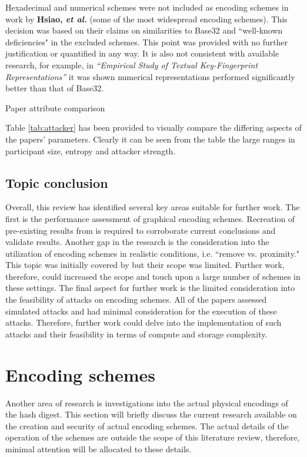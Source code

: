 Hexadecimal and numerical schemes were not included as encoding schemes in work by \textbf{Hsiao, \textit{et al.}}\cite{hsiao2009study} (some of the most widespread encoding schemes). This decision was based on their claims on similarities to Base32 and ``well-known deficiencies" in the excluded schemes. This point was provided with no further justification or quantified in any way. It is also not consistent with available research, for example, in \textit{``Empirical Study of Textual Key-Fingerprint Representations''}\cite{dechand2016empirical} it was shown numerical representations performed significantly better than that of Base32.

\begin{table}[h!]
    \makebox[\textwidth][c]{
        
    }%
    \caption{Paper attribute comparison}
    \label{tab:attacker}
\end{table}

Table \ref{tab:attacker} has been provided to visually compare the differing aspects of the papers' parameters. Clearly it can be seen from the table the large ranges in participant size, entropy and attacker strength.


\subsection{Topic conclusion}
Overall, this review has identified several key areas suitable for further work.
The first is the performance assessment of graphical encoding schemes. Recreation of pre-existing results from \cite{hsiao2009study}\cite{tan2017can} is required to corroborate current conclusions and validate results.
Another gap in the research is the consideration into the utilization of encoding schemes in realistic conditions, i.e. ``remove vs. proximity." This topic was initially covered by \cite{shirvanian2017pitfalls} but their scope was limited. Further work, therefore, could increased the scope and touch upon a large number of schemes in these settings.
The final aspect for further work is the limited consideration into the feasibility of attacks on encoding schemes. All of the papers assessed simulated attacks and had minimal consideration for the execution of these attacks. Therefore, further work could delve into the implementation of such attacks and their feasibility in terms of compute and storage complexity.

\section{Encoding schemes}
Another area of research is investigations into the actual physical encodings of the hash digest. This section will briefly discuss the current research available on the creation and security of actual encoding schemes. The actual details of the operation of the schemes are outside the scope of this literature review, therefore, minimal attention will be allocated to these details.

